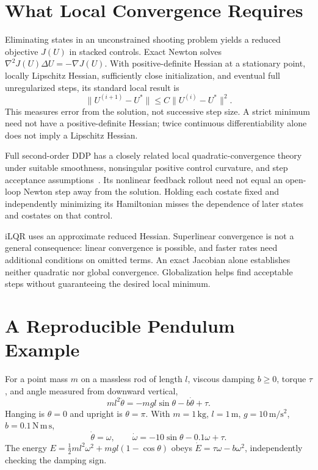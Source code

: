 \section{What Local Convergence Requires}
\label{sec:ch5:ddp-as-newton}

Eliminating states in an unconstrained shooting problem yields a reduced
objective $J(U)$ in stacked controls. Exact Newton solves
$\nabla^2J(U)\Delta U=-\nabla J(U)$. With positive-definite Hessian at a
stationary point, locally Lipschitz Hessian, sufficiently close initialization,
and eventual full unregularized steps, its standard local result is
\begin{equation}
\|U^{(i+1)}-U^*\|\le C\|U^{(i)}-U^*\|^2.
\label{eq:ch5:quad-convergence}
\end{equation}
This measures error from the solution, not successive step size. A strict
minimum need not have a positive-definite Hessian; twice continuous
differentiability alone does not imply a Lipschitz Hessian.

Full second-order DDP has a closely related local quadratic-convergence theory
under suitable smoothness, nonsingular positive control curvature, and step
acceptance assumptions~\cite{jacobson1970dpp}. Its nonlinear feedback rollout
need not equal an open-loop Newton step away from the solution. Holding each
costate fixed and independently minimizing its Hamiltonian misses the dependence
of later states and costates on that control.

iLQR uses an approximate reduced Hessian. Superlinear convergence is not a
general consequence: linear convergence is possible, and faster rates need
additional conditions on omitted terms. An exact Jacobian alone establishes
neither quadratic nor global convergence. Globalization helps find acceptable
steps without guaranteeing the desired local minimum.

\section{A Reproducible Pendulum Example}

For a point mass $m$ on a massless rod of length $l$, viscous damping $b\ge0$,
torque $\tau$, and angle measured from downward vertical,
\begin{equation}
ml^2\ddot\theta=-mgl\sin\theta-b\dot\theta+\tau.
\label{eq:ch5:pendulum-dynamics}
\end{equation}
Hanging is $\theta=0$ and upright is $\theta=\pi$. With $m=1\,\mathrm{kg}$,
$l=1\,\mathrm m$, $g=10\,\mathrm{m/s^2}$, $b=0.1\,\mathrm{N\,m\,s}$,
\begin{equation}
\dot\theta=\omega,\qquad\dot\omega=-10\sin\theta-0.1\omega+\tau.
\label{eq:ch5:pendulum-first-order}
\end{equation}
The energy $E=\tfrac12ml^2\omega^2+mgl(1-\cos\theta)$ obeys
$\dot E=\tau\omega-b\omega^2$, independently checking the damping sign.

